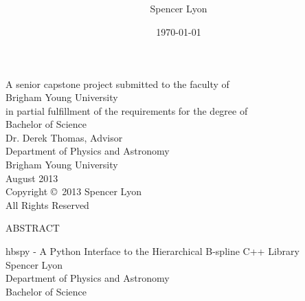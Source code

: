 \documentclass[12pt, twoside]{article}
\title{
    \vspace{-.6in}
    \usefont{OT1}{bch}{b}{n}
    \normalfont \normalsize \textsc{ } \\ [25pt]
    \horrule{0.5pt}
    \huge \thetitle \\
    \horrule{2pt}
  }
\author{
    Spencer Lyon
  }
\date{
  \normalfont \normalsize
  \today \\[-4pt] \normalsize
  }
\theoremstyle{definition} %
\numberwithin{equation}{section}
\newcommand \thetitle{hbspy -  A Python Interface to the Hierarchical B-spline C++ Library}
\begin{document}
\begin{titlepage}
  \maketitle
  \thispagestyle{empty}
  \begin{center}

  A senior capstone project submitted to the faculty of \\
  Brigham Young University\\
  in partial fulfillment of the requirements for the degree of \\[\baselineskip]
  Bachelor of Science \\ [1.5cm]

  Dr. Derek Thomas, Advisor \\ [1.5cm]

  Department of Physics and Astronomy \\[\baselineskip]
  Brigham Young University \\[\baselineskip]
  August 2013\\[2.0cm]

  Copyright \copyright\ 2013 Spencer Lyon \\[\baselineskip]

  All Rights Reserved


  \end{center}
\end{titlepage}

  \newpage
  \thispagestyle{empty}
  {\centering
  \large ABSTRACT \\ [\baselineskip]

  \normalfont \normalsize

  \thetitle \\ [\baselineskip]

  Spencer Lyon\\
  Department of Physics and Astronomy\\
  Bachelor of Science \\ [\baselineskip]
  }
\end{document}
